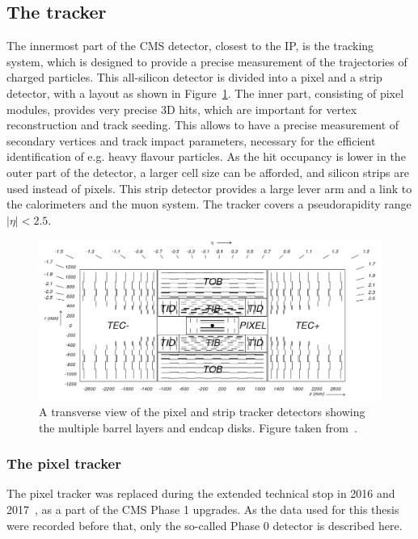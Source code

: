 \subsection{The tracker}

The innermost part of the \ac{CMS} detector, closest to the \ac{IP}, is the tracking system, which is designed to provide a precise measurement of the trajectories of charged particles. This all-silicon detector is divided into a pixel and a strip detector, with a layout as shown in Figure~\ref{fig:cmstracker}. The inner part, consisting of pixel modules, provides very precise 3D hits, which are important for vertex reconstruction and track seeding. This allows to have a precise measurement of secondary vertices and track impact parameters, necessary for the efficient identification of e.g. heavy flavour particles. As the hit occupancy is lower in the outer part of the detector, a larger cell size can be afforded, and silicon strips are used instead of pixels. This strip detector provides a large lever arm and a link to the calorimeters and the muon system. The tracker covers a pseudorapidity range $|\eta| < 2.5$.

\begin{figure}[ht]
  \centering
 \includegraphics[width=\textwidth]{fig_cmstracker}
 \caption{A transverse view of the pixel and strip tracker detectors showing the multiple barrel layers and endcap disks. Figure taken from~\cite{Chatrchyan:2008aa}.}
 \label{fig:cmstracker}
\end{figure}

\subsubsection{The pixel tracker} 

The pixel tracker was replaced during the extended technical stop in 2016 and 2017~\cite{CMS:2012sda}, as a part of the \ac{CMS} Phase 1 upgrades. As the data used for this thesis were recorded before that, only the so-called Phase 0 detector is described here. 

